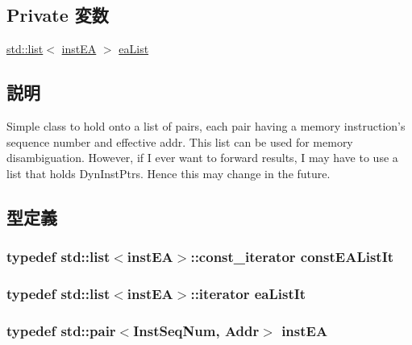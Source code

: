 \subsection*{Private 変数}
\begin{DoxyCompactItemize}
\item 
\hyperlink{classstd_1_1list}{std::list}$<$ \hyperlink{classstd_1_1pair}{instEA} $>$ \hyperlink{classEAList_a22eb03f3c4b21316c6306cdb13be5669}{eaList}
\end{DoxyCompactItemize}


\subsection{説明}
Simple class to hold onto a list of pairs, each pair having a memory instruction's sequence number and effective addr. This list can be used for memory disambiguation. However, if I ever want to forward results, I may have to use a list that holds DynInstPtrs. Hence this may change in the future. 

\subsection{型定義}
\hypertarget{classEAList_aa4e8e7ca0b8974dee456db31dd748004}{
\subsubsection[{constEAListIt}]{\setlength{\rightskip}{0pt plus 5cm}typedef {\bf std::list}$<${\bf instEA}$>$::const\_\-iterator {\bf constEAListIt}}}
\label{classEAList_aa4e8e7ca0b8974dee456db31dd748004}
\hypertarget{classEAList_ad188172370c0b3d51c146fa8eb66b9f0}{
\subsubsection[{eaListIt}]{\setlength{\rightskip}{0pt plus 5cm}typedef {\bf std::list}$<${\bf instEA}$>$::iterator {\bf eaListIt}}}
\label{classEAList_ad188172370c0b3d51c146fa8eb66b9f0}
\hypertarget{classEAList_a070c73793b8096456a77aa2acc2a674d}{
\subsubsection[{instEA}]{\setlength{\rightskip}{0pt plus 5cm}typedef {\bf std::pair}$<${\bf InstSeqNum}, {\bf Addr}$>$ {\bf instEA}}}
\label{classEAList_a070c73793b8096456a77aa2acc2a674d}


